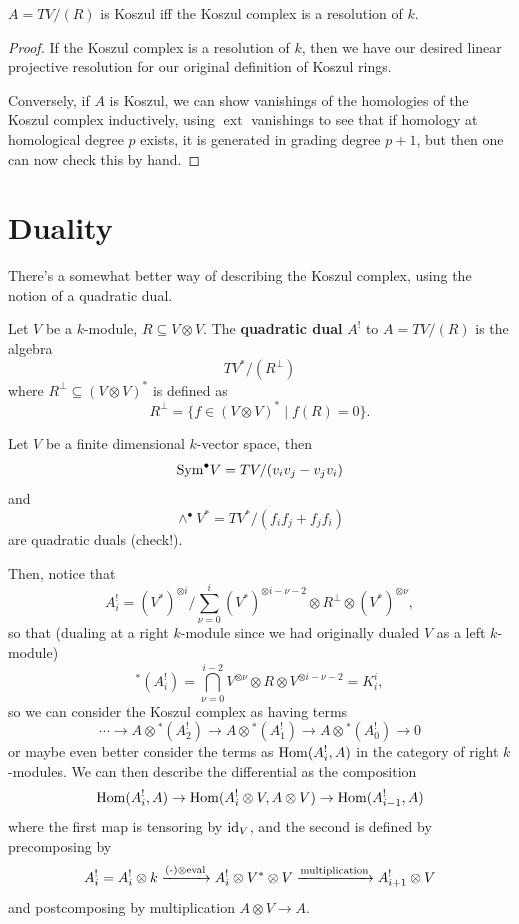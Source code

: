 \documentclass[12pt]{article}
\DeclareMathOperator{\ext}{ext}
\begin{document}
\begin{prop}
    $A=TV/(R)$ is Koszul iff the Koszul complex is a resolution of $k$.
\end{prop}

\begin{proof}
    If the Koszul complex is a resolution of $k$, then we have our desired linear projective resolution for our original definition of Koszul rings.

    Conversely, if $A$ is Koszul, we can show vanishings of the homologies of the Koszul complex inductively, using $\ext$ vanishings to see that if homology at homological degree $p$ exists, it is generated in grading degree $p+1$, but then one can now check this by hand.
\end{proof}



\section{Duality}

There's a somewhat better way of describing the Koszul complex, using the notion of a quadratic dual.

\begin{defn}
    Let $V$ be a $k$-module, $R\subseteq V\otimes V$. The \textbf{quadratic dual} $A^!$ to $A=TV/(R)$ is the algebra
    \[TV^*/(R^\perp)\]
    where $R^\perp \subseteq (V\otimes V)^*$ is defined as
    \[R^\perp = \{f\in (V\otimes V)^* \mid f(R)=0\}.\]
\end{defn}

\begin{eg}
    Let $V$ be a finite dimensional $k$-vector space, then
    \[\mathrm{Sym}^\bullet V = TV/(v_i v_j - v_j v_i)\]
    and
    \[\wedge^\bullet V^* = TV^*/(f_i f_j + f_j f_i)\]
    are quadratic duals (check!).
\end{eg}

Then, notice that
\[A^!_i = (V^*)^{\otimes i} / \sum_{\nu = 0}^i (V^*)^{\otimes i-\nu-2} \otimes R^\perp \otimes (V^*)^{\otimes \nu},\]
so that (dualing at a right $k$-module since we had originally dualed $V$ as a left $k$-module)
\[{}^*(A^!_i) = \bigcap_{\nu = 0}^{i-2} V^{\otimes \nu} \otimes R \otimes V^{\otimes i-\nu-2} = K_i^i,\]
so we can consider the Koszul complex as having terms
\[\cdots \to A\otimes {}^*(A^!_2) \to A\otimes {}^*(A^!_1) \to A\otimes {}^*(A^!_0) \to 0\]
or maybe even better consider the terms as $\mathrm{Hom}(A_i^!, A)$ in the category of right $k$-modules. We can then describe the differential as the composition
\[\mathrm{Hom}(A_i^!, A) \to \mathrm{Hom}(A_i^! \otimes V, A\otimes V) \to \mathrm{Hom}(A_{i-1}^!, A)\]
where the first map is tensoring by $\mathrm{id}_V$, and the second is defined by precomposing by
\[A^!_i = A^!_i \otimes k \xrightarrow{(\text{-})\otimes \mathrm{eval}} A^!_i \otimes V^* \otimes V \xrightarrow{\text{multiplication}} A^!_{i+1} \otimes V\]
and postcomposing by multiplication $A\otimes V\to A$.
\end{document}
